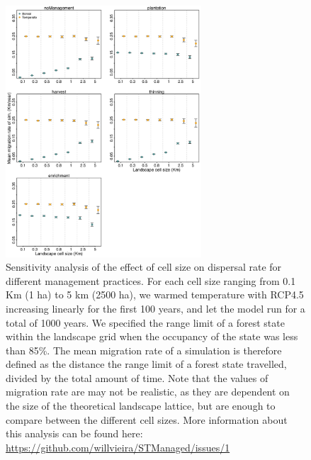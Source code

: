 \hypertarget{fig:sim-result-supp1_ch1}{%
\begin{figure}
\centering
\includegraphics[width=0.65\textwidth,height=\textheight]{manuscript/figs/58586171-78e3ab80-8228-11e9-9fa5-ec8354eae439.png}
\caption[{Sensitivity analysis of the effect of cell size on dispersal
rate for different management practices.}]{Sensitivity analysis of the
effect of cell size on dispersal rate for different management
practices. For each cell size ranging from 0.1 Km (1 ha) to 5 km (2500
ha), we warmed temperature with RCP4.5 increasing linearly for the first
100 years, and let the model run for a total of 1000 years. We specified
the range limit of a forest state within the landscape grid when the
occupancy of the state was less than 85\%. The mean migration rate of a
simulation is therefore defined as the distance the range limit of a
forest state travelled, divided by the total amount of time. Note that
the values of migration rate are may not be realistic, as they are
dependent on the size of the theoretical landscape lattice, but are
enough to compare between the different cell sizes. More information
about this analysis can be found here:
\url{https://github.com/willvieira/STManaged/issues/1}}
\label{fig:sim-result-supp1_ch1}
\end{figure}
}

\newpage

